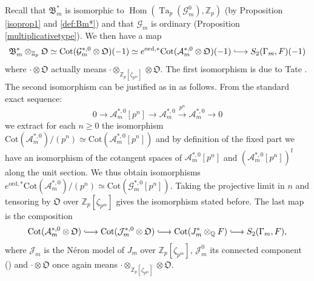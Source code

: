 \documentclass[a4paper,11pt]{amsart}
\numberwithin{equation}{section}
\theoremstyle{plain}
\theoremstyle{definition}
\theoremstyle{remark}
\newcommand{\Q}{\mathbb{Q}}
\newcommand{\Z}{\mathbb{Z}}
\DeclareMathOperator{\Hom}{Hom}
\DeclareMathOperator{\Ta}{Ta}
\newcommand{\ord}{\mathrm{ord}}
\newcommand{\Cot}{\mathrm{Cot}}
\newcommand{\longmono}{\mbox{\;$\lhook\joinrel\longrightarrow$\;}}
\begin{document}
Recall that $\mathfrak{B}_m^*$ 
is isomorphic to $\Hom(\Ta_p(\mathcal{G}_m^0),\Z_p)$ (by Proposition \ref{isoprop1} and \eqref{def:Bm*})
and that $\mathcal{G}_m$ is ordinary (Proposition \ref{multiplicativetype}). 
We then have a map 
\begin{equation}\label{Ohta2.1.7}
\mathfrak{B}_m^*\otimes_{\Z_p}\mathfrak{O}\simeq\Cot(\mathcal{G}^{*,0}_{m}\otimes\mathfrak{O})(-1)\simeq
e^{\ord,*}\Cot(\mathcal{A}_m^{*,0}\otimes\mathfrak{O})(-1)\longmono S_2(\Gamma_m,F)(-1)\end{equation}
where $\cdot\otimes\mathfrak{O}$ actually means $\cdot\otimes_{\Z_p[\zeta_{p^m}]}\otimes\mathfrak{O}$. The first isomorphism 
is due to Tate \cite[Section 4]{Tate-pdiv}. 
The second isomorphism can be justified as in \cite[(2.1.8), (2.1.9)]{OhtaMA} as follows. From the standard exact sequence: 
\[0\longrightarrow \mathcal{A}_m^{*,0}[p^n]\longrightarrow \mathcal{A}_m^{*,0}\overset{p^n}\longrightarrow \mathcal{A}_m^{*,0}\longrightarrow 0\] we extract for each $n\geq0$ the isomorphism 
$\Cot(\mathcal{A}_m^{*,0})/(p^n)\simeq\Cot(\mathcal{A}_m^{*,0}[p^n])$
and by definition of the fixed part we have an isomorphism of the cotangent spaces of 
$\mathcal{A}_m^{*,0}[p^n]$ and $ (\mathcal{A}_m^{*,0}[p^n])^\mathrm{f}$ along the unit section. 
We thus obtain isomorphisms $e^{\ord,*}\Cot(\mathcal{A}_m^{*,0})/(p^n)\simeq \Cot(\mathcal{G}_m^{*,0}[p^n])$.
Taking the projective limit in $n$ and tensoring by $\mathfrak{O}$ over $\Z_p[\zeta_{p^m}]$ gives the isomorphism stated before. 
The last map is the composition 
\begin{equation}\label{Ohta3.3.4.1}
\Cot(\mathcal{A}_m^{*,0}\otimes\mathfrak{O})\longmono 
\Cot(\mathcal{J}_m^{*,0}\otimes\mathfrak{O})\longmono 
\Cot(J_m^*\otimes_\Q F)\longmono 
S_2(\Gamma_m,F),\end{equation}
where $\mathcal{J}_m$ is the N\'eron model of $J_m$ over $\Z_p[\zeta_{p^m}]$, $\mathcal{J}_m^0$ its connected component (\cite[\S1b)]{Mazur-Rational}) and $\cdot\otimes\mathfrak{O}$ once again means $\cdot\otimes_{\Z_p[\zeta_{p^m}]}\otimes\mathfrak{O}$.
\end{document}
